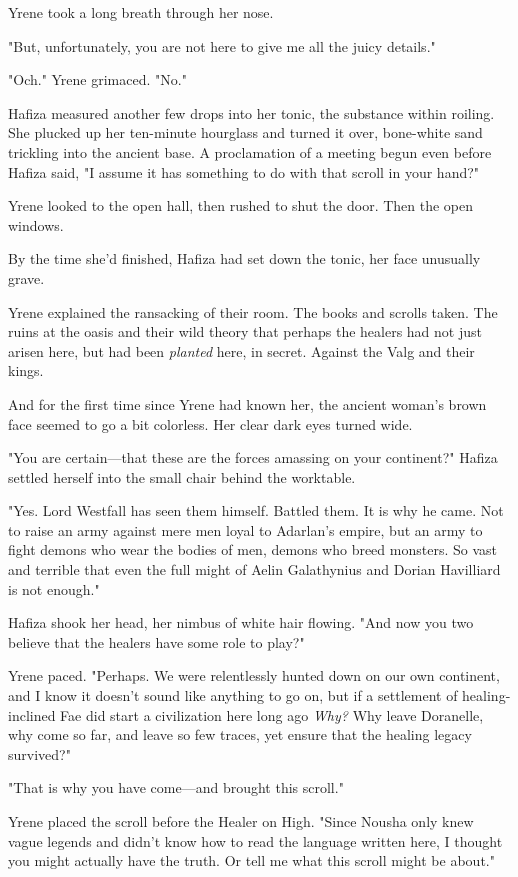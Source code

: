 Yrene took a long breath through her nose.

"But, unfortunately, you are not here to give me all the juicy details."

"Och." Yrene grimaced. "No."

Hafiza measured another few drops into her tonic, the substance within roiling. She plucked up her ten-minute hourglass and turned it over, bone-white sand trickling into the ancient base. A proclamation of a meeting begun even before Hafiza said, "I assume it has something to do with that scroll in your hand?"

Yrene looked to the open hall, then rushed to shut the door. Then the open windows.

By the time she'd finished, Hafiza had set down the tonic, her face unusually grave.

Yrene explained the ransacking of their room. The books and scrolls taken. The ruins at the oasis and their wild theory that perhaps the healers had not just arisen here, but had been \emph{planted} here, in secret. Against the Valg and their kings.

And for the first time since Yrene had known her, the ancient woman's brown face seemed to go a bit colorless. Her clear dark eyes turned wide.

"You are certain---that these are the forces amassing on your continent?" Hafiza settled herself into the small chair behind the worktable.

"Yes. Lord Westfall has seen them himself. Battled them. It is why he came. Not to raise an army against mere men loyal to Adarlan's empire, but an army to fight demons who wear the bodies of men, demons who breed monsters. So vast and terrible that even the full might of Aelin Galathynius and Dorian Havilliard is not enough."

Hafiza shook her head, her nimbus of white hair flowing. "And now you two believe that the healers have some role to play?"

Yrene paced. "Perhaps. We were relentlessly hunted down on our own continent, and I know it doesn't sound like anything to go on, but if a settlement of healing-inclined Fae did start a civilization here long ago  \emph{Why?} Why leave Doranelle, why come so far, and leave so few traces, yet ensure that the healing legacy survived?"

"That is why you have come---and brought this scroll."

Yrene placed the scroll before the Healer on High. "Since Nousha only knew vague legends and didn't know how to read the language written here, I thought you might actually have the truth. Or tell me what this scroll might be about."

